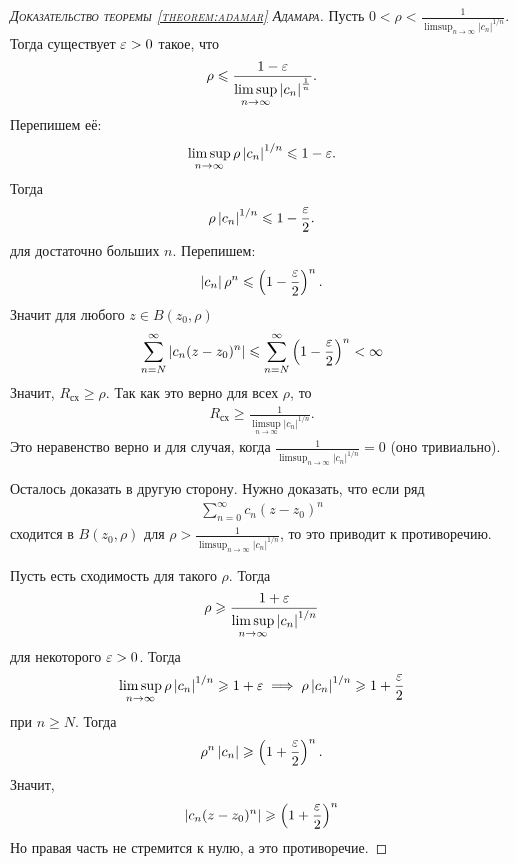 \begin{proof}[\normalfont\textsc{Доказательство теоремы \ref{theorem:adamar} Адамара}]
 Пусть $0 < \rho < \frac{1}{\limsup_{n \to \infty}\left| c_n \right|^{1 / n}}$. Тогда существует $\varepsilon > 0$ такое, что
 \begin{align*}
  \rho \leqslant \frac{1 - \varepsilon}{\limsup\limits_{n\to \infty} \left| c_n \right|^{\frac{1}{n}}}.
 \end{align*} Перепишем её:
 \begin{align*}
  \limsup\limits_{n\to \infty} \rho \left| c_n \right|^{1 / n} \leqslant 1 - \varepsilon.
 \end{align*} Тогда
 \begin{align*}
  \rho \left| c_n \right|^{1 / n} \leqslant 1 - \frac{\varepsilon}{2}.
 \end{align*} для достаточно больших $n$. Перепишем:
 \begin{align*}
  \left| c_n \right| \rho^{n} \leqslant \left( 1 - \frac{\varepsilon}{2} \right)^{n}.
 \end{align*} Значит для любого $z \in B(z_0, \rho)$
 \begin{align*}
  \sum_{n=N}^{\infty} \left| c_n(z - z_0)^{n} \right| \leqslant \sum_{n=N}^{\infty} \left(1 - \frac{\varepsilon}{2}\right)^{n} < \infty
 \end{align*} Значит, $R_{\text{сх}} \geqslant \rho$. Так как это верно для всех $\rho$, то
 \begin{align*}
  R_{\text{сх}} \geqslant \frac{1}{\limsup\limits_{n\to \infty} \left| c_n \right|^{1 / n}}.
 \end{align*} Это неравенство верно и для случая, когда $\frac{1}{\limsup_{n\to \infty} \left| c_n \right|^{1 / n}} = 0$ (оно тривиально).

 Осталось доказать в другую сторону. Нужно доказать, что если ряд \begin{align*}
  \sum_{n=0}^{\infty} c_n(z - z_0)^{n}
 \end{align*} сходится в $B(z_0, \rho)$ для $\rho > \frac{1}{\limsup_{n\to \infty} \left| c_n \right|^{1 / n}}$, то это приводит к противоречию.

Пусть есть сходимость для такого $\rho$. Тогда
\begin{align*}
 \rho \geqslant \frac{1 + \varepsilon}{\limsup\limits_{n \to \infty} \left| c_n \right|^{1 / n} }
\end{align*} для некоторого $\varepsilon > 0$. Тогда
\begin{align*}
 \limsup\limits_{ n \to \infty } \rho \left| c_n \right|^{1/ n} \geqslant 1 + \varepsilon \implies \rho \left| c_n \right|^{1 / n} \geqslant 1 + \frac{\varepsilon}{2}
\end{align*} при $n \geqslant N$. Тогда
\begin{align*}
 \rho^{n} \left| c_n \right| \geqslant \left( 1 + \frac{\varepsilon}{2} \right)^{n}.
\end{align*} Значит,
\begin{align*}
 \left| c_n (z - z_0)^{n} \right| \geqslant \left( 1 + \frac{\varepsilon}{2} \right)^{n}
\end{align*} Но правая часть не стремится к нулю, а это противоречие.
\end{proof}

